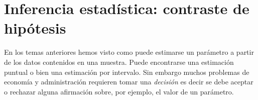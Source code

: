 \documentclass[12pt]{report}
\begin{document}

















\chapter{Inferencia estadística: contraste de hipótesis}
     En los temas anteriores hemos visto como puede estimarse un
     parámetro  a partir de los datos contenidos en una muestra.
     Puede encontrarse una  estimación puntual o bien una estimación
     por intervalo. Sin embargo muchos problemas de economía y
     administración requieren tomar una \emph{decisión} es decir se
     debe aceptar o rechazar  alguna afirmación sobre, por ejemplo,
     el valor de un parámetro.
\end{document}
